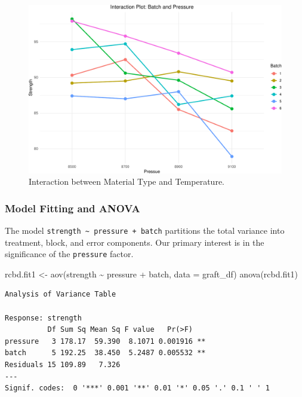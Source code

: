 \documentclass[
  letterpaper,
]{scrbook}
\newenvironment{Shaded}{\begin{snugshade}}{\end{snugshade}}
\newcommand{\AttributeTok}[1]{\textcolor[rgb]{0.40,0.45,0.13}{#1}}
\newcommand{\FunctionTok}[1]{\textcolor[rgb]{0.28,0.35,0.67}{#1}}
\newcommand{\NormalTok}[1]{\textcolor[rgb]{0.00,0.23,0.31}{#1}}
\newcommand{\OtherTok}[1]{\textcolor[rgb]{0.00,0.23,0.31}{#1}}
\newcommand{\SpecialCharTok}[1]{\textcolor[rgb]{0.37,0.37,0.37}{#1}}
\begin{document}
\begin{figure}[H]

{\centering \includegraphics{unit5-factor/crbd_files/figure-pdf/plot-interaction-1.pdf}

}

\caption{Interaction between Material Type and Temperature.}

\end{figure}%

\subsubsection{Model Fitting and ANOVA}\label{model-fitting-and-anova}

The model \texttt{strength\ \textasciitilde{}\ pressure\ +\ batch}
partitions the total variance into treatment, block, and error
components. Our primary interest is in the significance of the
\texttt{pressure} factor.

\begin{Shaded}
\begin{Highlighting}[]
\NormalTok{rcbd.fit1 }\OtherTok{\textless{}{-}} \FunctionTok{aov}\NormalTok{(strength }\SpecialCharTok{\textasciitilde{}}\NormalTok{ pressure }\SpecialCharTok{+}\NormalTok{ batch, }\AttributeTok{data =}\NormalTok{ graft\_df)}
\FunctionTok{anova}\NormalTok{(rcbd.fit1)}
\end{Highlighting}
\end{Shaded}

\begin{verbatim}
Analysis of Variance Table

Response: strength
          Df Sum Sq Mean Sq F value   Pr(>F)   
pressure   3 178.17  59.390  8.1071 0.001916 **
batch      5 192.25  38.450  5.2487 0.005532 **
Residuals 15 109.89   7.326                    
---
Signif. codes:  0 '***' 0.001 '**' 0.01 '*' 0.05 '.' 0.1 ' ' 1
\end{verbatim}
\end{document}
